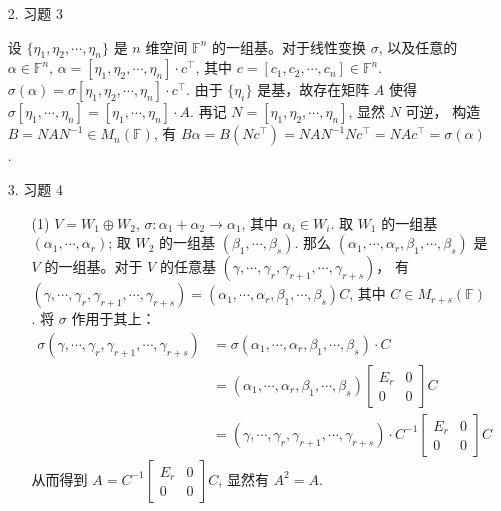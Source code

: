 \documentclass{article}
\begin{document}
\begin{spacing}{1.5}
\begin{enumerate}
    \item [2.] 习题 3
    
    设 $\{\eta_1, \eta_2, \cdots, \eta_n\}$ 是 $n$ 维空间 $\mathbb{F}^{n}$ 的一组基。对于线性变换 $\sigma$, 以及任意的 $\alpha\in \mathbb{F}^n$, $\alpha = [\eta_1, \eta_2, \cdots, \eta_n]\cdot c^\top$, 其中 $c = [c_1, c_2, \cdots, c_n] \in\mathbb{F}^n$. $\sigma(\alpha) = \sigma [\eta_1, \eta_2, \cdots, \eta_n]\cdot c^\top$. 由于 $\{\eta_i\}$ 是基，故存在矩阵 $A$ 使得 $\sigma [\eta_1, \cdots, \eta_n] = [\eta_1, \cdots, \eta_n] \cdot A$. 再记 $N = [\eta_1, \eta_2, \cdots, \eta_n]$, 显然 $N$ 可逆， 构造 $B = NAN^{-1}\in M_n(\mathbb{F})$, 有 $B\alpha = B(Nc^\top) = NAN^{-1}Nc^\top = NAc^\top = \sigma(\alpha)$.

    \item [3.] 习题 4
    
    \begin{itemize}
        \item [(1)] $V = W_1 \oplus W_2$, $\sigma: \alpha_1 + \alpha_2 \to \alpha_1$, 其中 $\alpha_i\in W_i$. 取 $W_1$ 的一组基 $(\alpha_1, \cdots, \alpha_r)$; 取 $W_2$ 的一组基 $(\beta_1, \cdots, \beta_s)$. 那么 $(\alpha_1, \cdots, \alpha_r, \beta_1, \cdots, \beta_s)$ 是 $V$ 的一组基。对于 $V$ 的任意基 $(\gamma,\cdots, \gamma_r, \gamma_{r+1},\cdots, \gamma_{r+s})$， 有 $(\gamma,\cdots, \gamma_r, \gamma_{r+1},\cdots, \gamma_{r+s}) = (\alpha_1, \cdots, \alpha_r, \beta_1, \cdots, \beta_s) C$, 其中 $C\in M_{r+s}(\mathbb{F})$. 将 $\sigma$ 作用于其上：$$\begin{array}{ll}\sigma (\gamma,\cdots, \gamma_r, \gamma_{r+1},\cdots, \gamma_{r+s}) &= \sigma (\alpha_1, \cdots, \alpha_r, \beta_1, \cdots, \beta_s)\cdot C \\ &= (\alpha_1, \cdots, \alpha_r, \beta_1, \cdots, \beta_s) \left[\begin{array}{cc}E_r&0\\0&0\end{array}\right]C\\&=(\gamma,\cdots, \gamma_r, \gamma_{r+1},\cdots, \gamma_{r+s})\cdot C^{-1} \left[\begin{array}{cc}E_r&0\\0&0\end{array}\right]C\end{array}$$
        从而得到 $A = C^{-1} \left[\begin{array}{cc}E_r&0\\0&0\end{array}\right] C$, 显然有 $A^2 = A$.


\end{itemize}
\end{enumerate}
\end{spacing}
\end{document}
